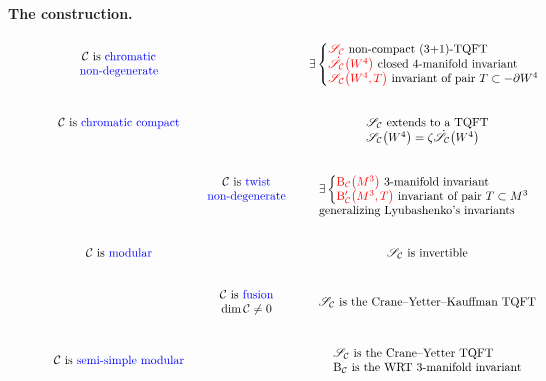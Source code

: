 \documentclass[pdftex]{sigma}
\numberwithin{equation}{section}
\numberwithin{theorem}{section}
\numberwithin{proposition}{section}
\numberwithin{definition}{section}
\numberwithin{lemma}{section}
\numberwithin{corollary}{section}
\numberwithin{remark}{section}
\numberwithin{example}{section}
\newcommand{\cat}{\mathcal{C}}
\newcommand{\TSkein}{{\mathscr{S}}}
\newcommand{\ThreeManInv}{\mathrm{B}}
\newcommand{\BB}{\ThreeManInv}
\begin{document}
\textbf{The construction.}
\begin{figure}[t]
 \centering
 \small
 \[\begin{tikzcd}[column sep=tiny]
 {\begin{array}{c} \cat\text{ is \color{blue}chromatic}\\\text{\color{blue} non-degenerate}
 \end{array} } &\ & {\exists \left\{\begin{array}{@{}l}{\color{red} \TSkein_\cat}\text{ non-compact (3+1)-TQFT}\\ {\color{red} \dot\TSkein_\cat\bigl(W^4\bigr)} \text{ closed 4-manifold invariant}\\{\color{red} \TSkein_\cat\bigl(W^4,T\bigr)}\text{ invariant of pair }T\subset -\partial W^4\end{array}\right.} \\
 {\cat \text{ is \color{blue}chromatic compact}} &\ & {\begin{array}[t]{l}\TSkein_\cat\text{ extends to a TQFT}\\\TSkein_\cat\bigl(W^4\bigr)=\zeta\dot\TSkein_\cat\bigl(W^4\bigr)\end{array}} \\
 & \begin{array}{c} \cat\text{ is \color{blue}twist}\\
 \text{\color{blue} non-degenerate} \end{array}
 &
 \begin{array}[t]{l}\exists\left\{
 \begin{array}{@{}l}{\color{red} \BB_\cat\bigl(M^3\bigr)}\text{ 3-manifold invariant} \\
 {\color{red}\BB'_\cat\bigl(M^3,T\bigr)}\text{ invariant of pair }T\subset M^3
 \end{array}\right.
 \\\text{generalizing Lyubashenko's invariants}
 \end{array}\\
 {\cat\text{ is \color{blue}modular}} &\ & {
\TSkein_\cat\text{ is invertible}
 }
 \\
 & \begin{array}{c} \cat\text{ is \color{blue}fusion}\\
 \dim\cat\neq0 \end{array} & \TSkein_\cat\text{ is the Crane--Yetter--Kauffman TQFT}\\
 {\cat\text{ is \color{blue}semi-simple modular}} &\ &
 {\begin{array}{l}\TSkein_\cat\text{ is the Crane--Yetter TQFT}\\\BB_\cat\text{ is the WRT 3-manifold invariant}\end{array}}

\end{tikzcd}\]
\end{figure}
\end{document}
